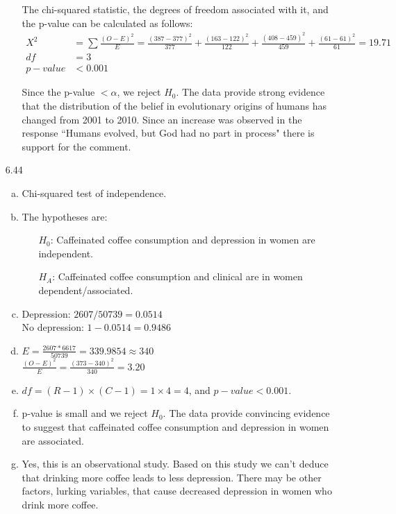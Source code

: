 \documentclass[11pt]{article}
\begin{document}
\begin{enumerate}
\begin{enumerate}[(a)]
The chi-squared statistic, the degrees of freedom associated with it, and the p-value can be calculated as follows:
\begin{align*}
X^2 &= \sum \frac{(O - E)^2}{E} =  \frac{(387 - 377)^2} {377} + \frac{(163 - 122)^2} {122} + \frac{(408 - 459)^2} {459} + \frac{(61 - 61)^2}{61} = 19.71 \\
df &= 3 \\
p-value &< 0.001
\end{align*}

Since the p-value $< \alpha$, we reject $H_0$. The data provide strong evidence that the distribution of the belief in evolutionary origins of humans has changed from 2001 to 2010. Since an increase was observed in the response ``Humans evolved, but God had no part in process" there is support for the comment.
\end{enumerate}

%

\item[6.44]
\begin{enumerate}[(a)]
\item Chi-squared test of independence.

\item The hypotheses are:
\begin{itemize}
\item[] $H_0$: Caffeinated coffee consumption and depression in women are independent.
\item[] $H_A$: Caffeinated coffee consumption and clinical are in women dependent/associated.
\end{itemize}

\item Depression: $2607 / 50739 = 0.0514$ \\
No depression: $1 - 0.0514 = 0.9486$

\item $E = \frac{2607 * 6617}{50739} = 339.9854 \approx 340$ \\
$\frac{(O - E)^2}{E} = \frac{(373 - 340)^2}{340} = 3.20$

\item $df = (R - 1) \times (C - 1) = 1 \times 4 = 4$, and $p-value < 0.001$.

\item p-value is small and we reject $H_0$. The data provide convincing evidence to suggest that caffeinated coffee consumption and depression in women are associated.

\item Yes, this is an observational study. Based on this study we can't deduce that drinking more coffee leads to less depression. There may be other factors, lurking variables, that cause decreased depression in women who drink more coffee.


\end{enumerate}
\end{enumerate}
\end{document}
